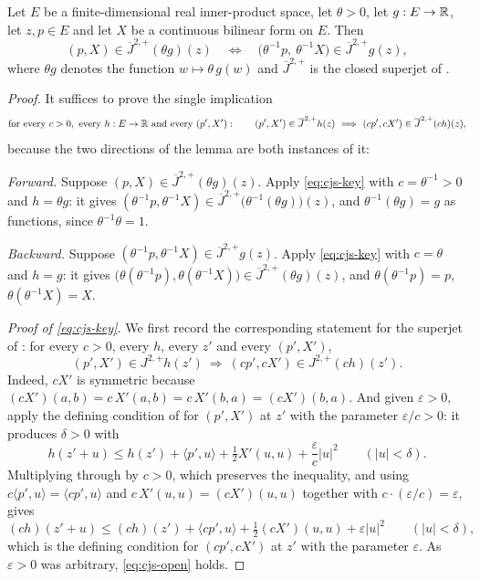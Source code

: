 \begin{lemma}
Let $E$ be a finite-dimensional real inner-product space, let $\theta>0$, let
$g:E\to\mathbb{R}$, let $z,p\in E$ and let $X$ be a continuous bilinear form on $E$.
Then
\[
  (p,X)\in\overline J^{2,+}(\theta g)(z)
  \quad\Longleftrightarrow\quad
  \bigl(\theta^{-1}p,\ \theta^{-1}X\bigr)\in\overline J^{2,+}g(z),
\]
where $\theta g$ denotes the function $w\mapsto\theta\,g(w)$ and
$\overline J^{2,+}$ is the closed superjet of .
\end{lemma}
\begin{proof}
It suffices to prove the single implication
\begin{equation}\label{eq:cjs-key}
  \text{for every }c>0,\ \text{every }h:E\to\mathbb{R}\ \text{and every }(p',X'):\qquad
  (p',X')\in\overline J^{2,+}h(z)\ \Longrightarrow\
  (cp',cX')\in\overline J^{2,+}(ch)(z),
\end{equation}
because the two directions of the lemma are both instances of it:

\emph{Forward.} Suppose $(p,X)\in\overline J^{2,+}(\theta g)(z)$. Apply
\eqref{eq:cjs-key} with $c=\theta^{-1}>0$ and $h=\theta g$: it gives
$(\theta^{-1}p,\theta^{-1}X)\in\overline J^{2,+}\bigl(\theta^{-1}(\theta
g)\bigr)(z)$, and $\theta^{-1}(\theta g)=g$ as functions, since
$\theta^{-1}\theta=1$.

\emph{Backward.} Suppose $(\theta^{-1}p,\theta^{-1}X)\in\overline J^{2,+}g(z)$.
Apply \eqref{eq:cjs-key} with $c=\theta$ and $h=g$: it gives
$\bigl(\theta(\theta^{-1}p),\theta(\theta^{-1}X)\bigr)
\in\overline J^{2,+}(\theta g)(z)$, and $\theta(\theta^{-1}p)=p$,
$\theta(\theta^{-1}X)=X$.

\emph{Proof of \eqref{eq:cjs-key}.}
We first record the corresponding statement for the superjet of
: for every $c>0$, every $h$, every $z'$ and every $(p',X')$,
\begin{equation}\label{eq:cjs-open}
  (p',X')\in J^{2,+}h(z')\ \Longrightarrow\ (cp',cX')\in J^{2,+}(ch)(z').
\end{equation}
Indeed, $cX'$ is symmetric because $(cX')(a,b)=c\,X'(a,b)=c\,X'(b,a)=(cX')(b,a)$.
And given $\varepsilon>0$, apply the defining condition of \noderef{Superjet}
for $(p',X')$ at $z'$ with the parameter $\varepsilon/c>0$: it produces
$\delta>0$ with
\[
  h(z'+u)\le h(z')+\langle p',u\rangle+\tfrac12X'(u,u)
    +\frac{\varepsilon}{c}|u|^2\qquad(|u|<\delta).
\]
Multiplying through by $c>0$, which preserves the inequality, and using
$c\langle p',u\rangle=\langle cp',u\rangle$ and $c\,X'(u,u)=(cX')(u,u)$ together
with $c\cdot(\varepsilon/c)=\varepsilon$, gives
\[
  (ch)(z'+u)\le(ch)(z')+\langle cp',u\rangle+\tfrac12(cX')(u,u)
    +\varepsilon|u|^2\qquad(|u|<\delta),
\]
which is the defining condition for $(cp',cX')$ at $z'$ with the parameter
$\varepsilon$. As $\varepsilon>0$ was arbitrary, \eqref{eq:cjs-open} holds.


\end{proof}
